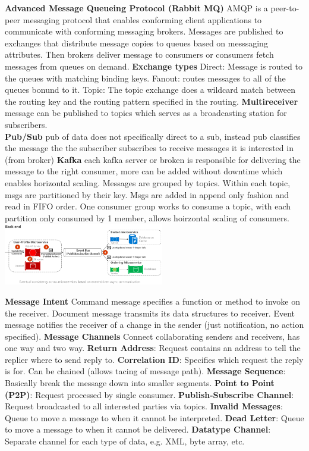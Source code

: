 \documentclass[10pt, landscape]{article}
\begin{document}
\begin{multicols}{4}
\textbf{Advanced Message Queueing Protocol (Rabbit MQ)} AMQP is a peer-to-peer messaging protocol that enables conforming client applications to communicate with conforming messaging brokers. Messages are published to exchanges that distribute message copies to queues based on messsaging attributes. Then brokers deliver  message  to consumers or consumers fetch messages from queues on demand. \textbf{Exchange types} Direct: Message is routed to the queues with matching binding keys. Fanout: routes messages to all of the queues bonund to it. Topic: The topic exchange does a wildcard match between the routing key and the routing pattern specified in the routing. 
\textbf{Multireceiver} message can be published to topics which serves as a broadcasting station for subscribers.\\ 

\textbf{Pub/Sub} pub of data does not specifically direct to a sub, instead pub classifies the message the the subscriber subscribes to receive messages it is interested in (from broker) 
\textbf{Kafka} each kafka server or broken is responsible for delivering the message to the right consumer, more can be added without downtime which enables horizontal scaling. Messages are grouped by topics. Within each topic, msgs are partitioned by their key. Msgs are added in append only fashion and read in FIFO order. One consumer group works to consume a topic, with each partition only consumed by 1 member, allows hoirzontal scaling of consumers. \\
\includegraphics*[width=7cm]{pubsub.png}

\textbf{Message Intent} Command message specifies a function or method to invoke on the receiver. Document message transmits its data structures to receiver. Event message notifies the receiver of a change in the sender (just notification, no action specified). \textbf{Message Channels} Connect collaborating senders and receivers, has one way and two way. \textbf{Return Address}: Request contains an address to tell the replier where to send reply to.
\textbf{Correlation ID}: Specifies which request the reply is for. Can be chained (allows tacing of message path).
\textbf{Message Sequence}: Basically break the message down into smaller segments.
\textbf{Point to Point (P2P)}: Request processed by single consumer.
\textbf{Publish-Subscribe Channel}: Request broadcasted to all interested parties via topics.
\textbf{Invalid Messages}: Queue to move a message to when it cannot be interpreted.
\textbf{Dead Letter}: Queue to move a message to when it cannot be delivered.
\textbf{Datatype Channel}: Separate channel for each type of data, e.g. XML, byte array, etc.\\


\end{multicols}
\end{document}
